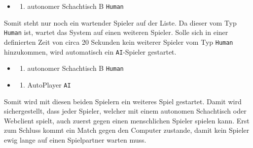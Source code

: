\begin{itemize}
\item
  \begin{enumerate}
  \def\labelenumi{\arabic{enumi}.}
  \tightlist
  \item
    autonomer Schachtisch B \passthrough{\lstinline!Human!}
  \end{enumerate}
\end{itemize}

Somit steht nur noch ein wartender Spieler auf der Liste. Da dieser vom
Typ \passthrough{\lstinline!Human!} ist, wartet das System auf einen
weiteren Spieler. Solle sich in einer definierten Zeit von circa 20
Sekunden kein weiterer Spieler vom Typ \passthrough{\lstinline!Human!}
hinzukommen, wird automatisch ein \passthrough{\lstinline!AI!}-Spieler
gestartet.

\begin{itemize}
\item
  \begin{enumerate}
  \def\labelenumi{\arabic{enumi}.}
  \tightlist
  \item
    autonomer Schachtisch B \passthrough{\lstinline!Human!}
  \end{enumerate}
\item
  \begin{enumerate}
  \def\labelenumi{\arabic{enumi}.}
  \setcounter{enumi}{1}
  \tightlist
  \item
    AutoPlayer \passthrough{\lstinline!AI!}
  \end{enumerate}
\end{itemize}

Somit wird mit diesen beiden Spielern ein weiteres Spiel gestartet.
Damit wird sichergestellt, dass jeder Spieler, welcher mit einem
autonomen Schachtisch oder Webclient spielt, auch zuerst gegen einen
menschlichen Spieler spielen kann. Erst zum Schluss kommt ein Match
gegen den Computer zustande, damit kein Spieler ewig lange auf einen
Spielpartner warten muss.


